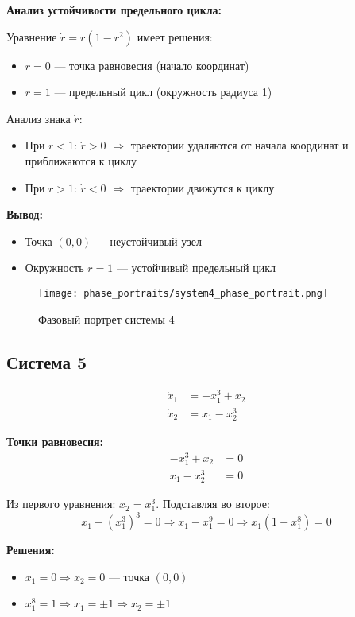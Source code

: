 \textbf{Анализ устойчивости предельного цикла:}

Уравнение $\dot{r} = r(1 - r^2)$ имеет решения:
\begin{itemize}
\item $r = 0$ --- точка равновесия (начало координат)
\item $r = 1$ --- предельный цикл (окружность радиуса 1)
\end{itemize}

Анализ знака $\dot{r}$:
\begin{itemize}
\item При $r < 1$: $\dot{r} > 0$ $\Rightarrow$ траектории удаляются от начала координат и приближаются к циклу
\item При $r > 1$: $\dot{r} < 0$ $\Rightarrow$ траектории движутся к циклу
\end{itemize}

\textbf{Вывод:}
\begin{itemize}
\item Точка $(0,0)$ --- неустойчивый узел
\item Окружность $r = 1$ --- устойчивый предельный цикл
\end{itemize}

\begin{figure}[H]
\centering
\texttt{[image: phase\_portraits/system4\_phase\_portrait.png]}
\caption{Фазовый портрет системы 4}
\label{fig:system4_phase_portrait}
\end{figure}

\subsection*{Система 5}

\begin{align}
\dot{x}_1 &= -x_1^3 + x_2 \\
\dot{x}_2 &= x_1 - x_2^3
\end{align}

\textbf{Точки равновесия:}
\begin{align}
-x_1^3 + x_2 &= 0 \\
x_1 - x_2^3 &= 0
\end{align}

Из первого уравнения: $x_2 = x_1^3$. Подставляя во второе:
$$x_1 - (x_1^3)^3 = 0 \Rightarrow x_1 - x_1^9 = 0 \Rightarrow x_1(1 - x_1^8) = 0$$

\textbf{Решения:}
\begin{itemize}
\item $x_1 = 0 \Rightarrow x_2 = 0$ --- точка $(0, 0)$
\item $x_1^8 = 1 \Rightarrow x_1 = \pm 1 \Rightarrow x_2 = \pm 1$
\end{itemize}

